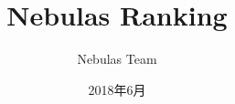 \documentclass[14pt]{article}
\begin{document}
\renewcommand{\contentsname}{目录}
\renewcommand{\abstractname}{摘要}
\renewcommand{\refname}{参考文献}
\renewcommand{\figurename}{图}
\renewcommand{\tablename}{表}
\renewcommand{\baselinestretch}{1.5}
\renewcommand{\appendixname}{附录}


\pagecolor{yellow!30}

\title{
  Nebulas Ranking
}

\author {Nebulas Team}
\date{2018年6月}

\maketitle












\begin{appendices}

\end{appendices}
\end{document}
